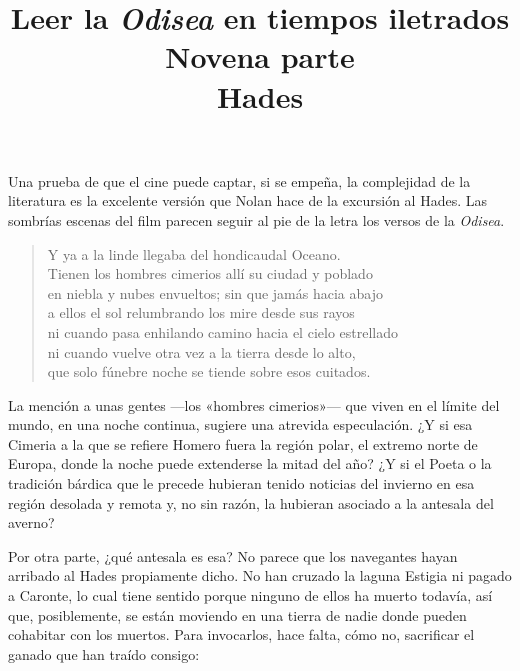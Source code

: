 \documentclass[11pt,a4paper]{article}
\title{Leer la \emph{Odisea} en tiempos iletrados \\ Novena parte \\ Hades}
\author{}
\date{}
\begin{document}
\maketitle

Una prueba de que el cine puede captar, si se empeña, la complejidad de la literatura es la excelente versión que Nolan hace de la excursión al Hades. Las sombrías escenas del film parecen seguir al pie de la letra los versos de la \emph{Odisea}.

\begin{verse}
Y ya a la linde llegaba del hondicaudal Oceano.\\
Tienen los hombres cimerios allí su ciudad y poblado\\
en niebla y nubes envueltos; sin que jamás hacia abajo\\
a ellos el sol relumbrando los mire desde sus rayos\\
ni cuando pasa enhilando camino hacia el cielo estrellado\\
ni cuando vuelve otra vez a la tierra desde lo alto,\\
que solo fúnebre noche se tiende sobre esos cuitados.
\end{verse}

La mención a unas gentes ---los «hombres cimerios»--- que viven en el límite del mundo, en una noche continua, sugiere una atrevida especulación. ¿Y si esa Cimeria a la que se refiere Homero fuera la región polar, el extremo norte de Europa, donde la noche puede extenderse la mitad del año? ¿Y si el Poeta o la tradición bárdica que le precede hubieran tenido noticias del invierno en esa región desolada y remota y, no sin razón, la hubieran asociado a la antesala del averno?

Por otra parte, ¿qué antesala es esa? No parece que los navegantes hayan arribado al Hades propiamente dicho. No han cruzado la laguna Estigia ni pagado a Caronte, lo cual tiene sentido porque ninguno de ellos ha muerto todavía, así que, posiblemente, se están moviendo en una tierra de nadie donde pueden cohabitar con los muertos. Para invocarlos, hace falta, cómo no, sacrificar el ganado que han traído consigo:
\end{document}
